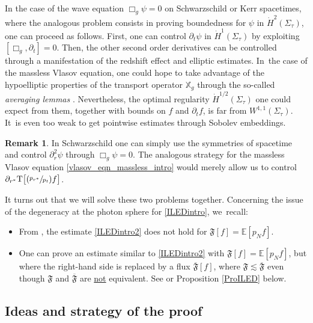 \documentclass[10pt]{amsart}
\newcommand{\Psfrac}[2]{(\sfrac{#1}{#2})}
\theoremstyle{plain}
\theoremstyle{definition}
\newtheorem{remark}[proposition]{Remark}
\newcommand\T{{\mathbb{X}}}
\begin{document}
\begin{enumerate}
In the case of the wave equation $\Box_g \psi =0$ on Schwarzschild or Kerr spacetimes, where the analogous problem consists in proving boundedness for $\psi$ in $\dot{H}^2(\Sigma_\tau)$, one can proceed as follows. First, one can control $\partial_t \psi$ in $\dot{H}^1(\Sigma_\tau)$ by exploiting $[\Box_g, \partial_t ]=0$. Then, the other second order derivatives can be controlled through a manifestation of the redshift effect and elliptic estimates. In~the case of the massless Vlasov equation, one could hope to take advantage of the hypoelliptic properties of the transport operator $\T_g$ through the so-called \textit{averaging lemmas} \cite{Ag84, averaginglemmas}. Nevertheless, the optimal regularity $\dot{H}^{1/2}(\Sigma_\tau)$ one could expect from them, together with bounds on $f$ and $\partial_t f$, is far from $W^{1,1}(\Sigma_\tau)$. It~is even too weak to get pointwise estimates through Sobolev embeddings.

\begin{remark}
In Schwarzschild one can simply use the symmetries of spacetime and control $\partial_r^2 \psi$ through $\Box_g \psi =0$. The analogous strategy for the massless Vlasov equation \eqref{vlasov_eqn_massless_intro} would merely allow us to control $\partial_{r^*} \mathrm{T}\bigl[\Psfrac{p_{r^*}}{p_t}f \bigr]$.
\end{remark}
\end{enumerate}

It turns out that we will solve these two problems together. Concerning the issue of the degeneracy at the photon sphere for \eqref{ILEDintro}, we~recall:
\begin{itemize}
\item From \cite[Prop.\,3.12]{L23}, the estimate \eqref{ILEDintro2} does not hold for $\mathfrak{F}[f]=\mathbb{E}[p_Nf]$.
\item One can prove an estimate similar to \eqref{ILEDintro2} with $\mathfrak{F}[f]=\mathbb{E}[p_Nf]$, but where the right-hand side is replaced by a flux $\overline{\mathfrak{F}}[f]$, where $\mathfrak{F} \lesssim \overline{\mathfrak{F}}$ even though $\mathfrak{F}$ and $\overline{\mathfrak{F}}$ are \underline{not} equivalent. See \cite[Prop.\,3.2]{L23} or Proposition \ref{ProILED} below.
\end{itemize}

\subsection{Ideas and strategy of the proof}\label{Subsecideas}
\end{document}
